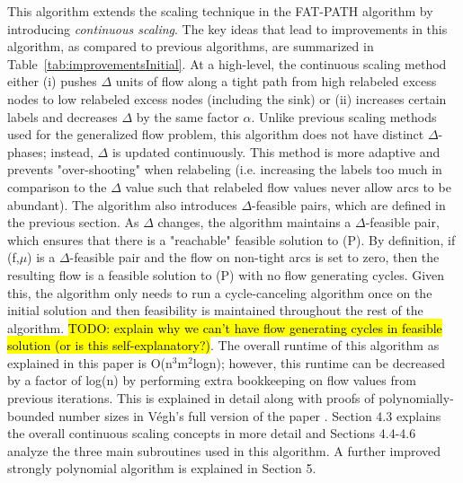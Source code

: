 \documentclass[11pt]{article}
\theoremstyle{definition}
\theoremstyle{definition}
\newcommand{\todo}[1]{\hl{TODO: #1}}
\begin{document}
	This algorithm extends the scaling technique in the FAT-PATH algorithm \cite{Goldberg:1991:CAG:105014.105022} by introducing \textit{continuous scaling}. The key ideas that lead to improvements in this algorithm, as compared to previous algorithms, are summarized in Table~\ref{tab:improvementsInitial}. At a high-level, the continuous scaling method either (i) pushes $\Delta$ units of flow along a tight path from high relabeled excess nodes to low relabeled excess nodes (including the sink) or (ii) increases certain labels and decreases $\Delta$ by the same factor $\alpha$. Unlike previous scaling methods used for the generalized flow problem, this algorithm does not have distinct $\Delta$-phases; instead, $\Delta$ is updated continuously. This method is more adaptive and prevents "over-shooting" when relabeling (i.e. increasing the labels too much in comparison to the $\Delta$ value such that relabeled flow values never allow arcs to be abundant). The algorithm also introduces $\Delta$-feasible pairs, which are defined in the previous section. As $\Delta$ changes, the algorithm maintains a $\Delta$-feasible pair, which ensures that there is a "reachable" feasible solution to (P). By definition, if (f,$\mu$) is a $\Delta$-feasible pair and the flow on non-tight arcs is set to zero, then the resulting flow is a feasible solution to (P) with no flow generating cycles. Given this, the algorithm only needs to run a cycle-canceling algorithm once on the initial solution and then feasibility is maintained throughout the rest of the algorithm. \todo{explain why we can't have flow generating cycles in feasible solution (or is this self-explanatory?)}. The overall runtime of this algorithm as explained in this paper is O(n$^3$m$^2$logn); however, this runtime can be decreased by a factor of log(n) by performing extra bookkeeping on flow values from previous iterations. This is explained in detail along with proofs of polynomially-bounded number sizes in Végh's full version of the paper \cite{article}. Section 4.3 explains the overall continuous scaling concepts in more detail and Sections 4.4-4.6 analyze the three main subroutines used in this algorithm. A further improved strongly polynomial algorithm is explained in Section 5.
	 
\end{document}
